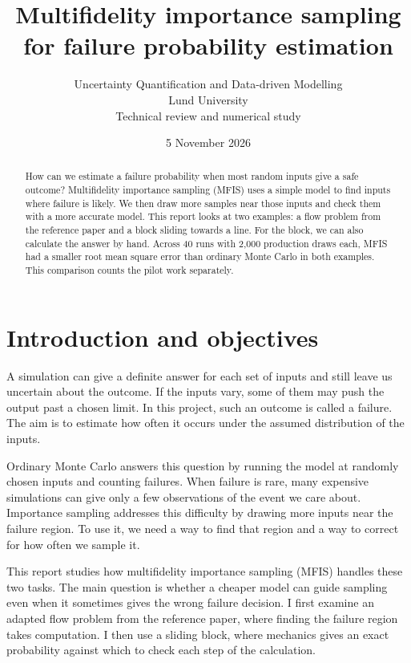 \documentclass[11pt,a4paper]{article}
\title{Multifidelity importance sampling for failure probability estimation}
\author{Uncertainty Quantification and Data-driven Modelling\\Lund University\\Technical review and numerical study}
\date{5 November 2026}
\begin{document}
\maketitle

\begin{abstract}
How can we estimate a failure probability when most random inputs give a safe outcome? Multifidelity importance sampling (MFIS) uses a simple model to find inputs where failure is likely. We then draw more samples near those inputs and check them with a more accurate model. This report looks at two examples: a flow problem from the reference paper and a block sliding towards a line. For the block, we can also calculate the answer by hand. Across 40 runs with 2,000 production draws each, MFIS had a smaller root mean square error than ordinary Monte Carlo in both examples. This comparison counts the pilot work separately.
\end{abstract}

\section{Introduction and objectives}
A simulation can give a definite answer for each set of inputs and still leave us uncertain about the outcome. If the inputs vary, some of them may push the output past a chosen limit. In this project, such an outcome is called a failure. The aim is to estimate how often it occurs under the assumed distribution of the inputs.

Ordinary Monte Carlo answers this question by running the model at randomly chosen inputs and counting failures. When failure is rare, many expensive simulations can give only a few observations of the event we care about. Importance sampling addresses this difficulty by drawing more inputs near the failure region. To use it, we need a way to find that region and a way to correct for how often we sample it.

This report studies how multifidelity importance sampling (MFIS) handles these two tasks. The main question is whether a cheaper model can guide sampling even when it sometimes gives the wrong failure decision. I first examine an adapted flow problem from the reference paper, where finding the failure region takes computation. I then use a sliding block, where mechanics gives an exact probability against which to check each step of the calculation.
\end{document}
